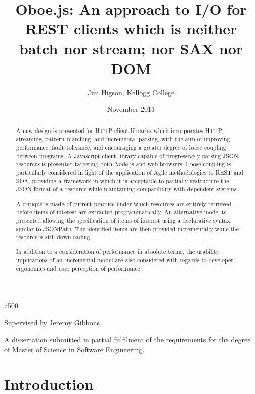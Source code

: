 \documentclass[12pt, ]{article}
\title{Oboe.js: An approach to I/O for REST clients which is neither batch nor
stream; nor SAX nor DOM}
\author{Jim Higson, Kellogg College}
\date{November 2013}
\let\stdsection\section
\renewcommand\section{\newpage\stdsection}
\begin{document}
\raggedbottom
{} 7500
\addtolength{\topskip}{0pt plus 10pt}

\maketitle

\begin{center}
{\large Supervised by Jeremy Gibbons}

A dissertation submitted in partial fulfilment of the requirements for the degree of 
Master of Science in Software Engineering.
\end{center}

\begin{abstract}
A new design is presented for HTTP client libraries which incorporates
HTTP streaming, pattern matching, and incremental parsing, with the aim
of improving performance, fault tolerance, and encouraging a greater
degree of loose coupling between programs. A Javascript client library
capable of progressively parsing JSON resources is presented targeting
both Node.js and web browsers. Loose coupling is particularly considered
in light of the application of Agile methodologies to REST and SOA,
providing a framework in which it is acceptable to partially restructure
the JSON format of a resource while maintaining compatibility with
dependent systems.

A critique is made of current practice under which resources are
entirely retrieved before items of interest are extracted
programmatically. An alternative model is presented allowing the
specification of items of interest using a declarative syntax similar to
JSONPath. The identified items are then provided incrementally while the
resource is still downloading.

In addition to a consideration of performance in absolute terms, the
usability implications of an incremental model are also considered with
regards to developer ergonomics and user perception of performance.
\end{abstract}


{
\clearpage
\hypersetup{linkcolor=black}
\setcounter{tocdepth}{3}
\tableofcontents
}

\clearpage
\listoffigures

\clearpage

\section{Introduction}\label{introduction}
\end{document}
